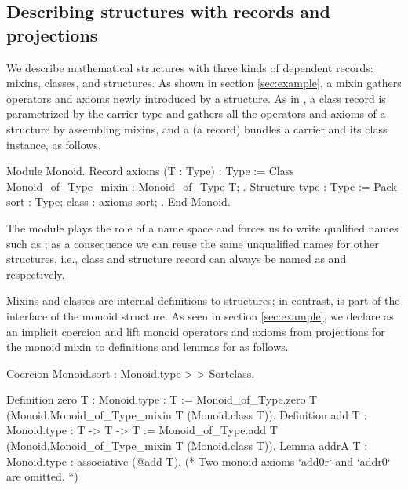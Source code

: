 \documentclass[a4paper,UKenglish,cleveref, autoref]{lipics-v2019}
\newcommand{\mixin}{mixin}
\theoremstyle{implem}
\theoremstyle{implem}
\theoremstyle{command}
\begin{document}
\subsection{Describing structures with records and projections}

We describe mathematical structures with three kinds of dependent records: mixins, classes, and structures.
As shown in section \ref{sec:example}, a \mixin{} gathers operators and axioms newly introduced by a structure.
As in \cite[section 2.4]{DBLP:conf/tphol/GarillotGMR09}\cite[section 2]{KSdraft}, a class record is parametrized by the carrier type  and gathers all the operators and axioms of a structure by assembling mixins, and a  (a record) bundles a carrier and its class instance, as follows.
\begin{coqcode}
Module Monoid.
Record axioms (T : Type) : Type :=
  Class { Monoid_of_Type_mixin : Monoid_of_Type T; }.
Structure type : Type := Pack { sort : Type; class : axioms sort; }.
End Monoid.
\end{coqcode}
The  module plays the role of a name space and forces us to write
qualified names such as ; as a consequence we can reuse the
same unqualified names for other structures, i.e., class and structure record
can always be named as  and  respectively.

Mixins and classes are internal definitions to structures; in contrast,
 is part of the interface of the monoid structure.
As seen in section \ref{sec:example}, we declare  as an
implicit coercion and lift monoid operators and axioms from projections for
the monoid \mixin{} to definitions and lemmas for  as follows.
\begin{coqcode}
Coercion Monoid.sort : Monoid.type >-> Sortclass.

Definition zero {T : Monoid.type} : T :=
  Monoid_of_Type.zero T (Monoid.Monoid_of_Type_mixin T (Monoid.class T)).
Definition add {T : Monoid.type} : T -> T -> T :=
  Monoid_of_Type.add T (Monoid.Monoid_of_Type_mixin T (Monoid.class T)).
Lemma addrA {T : Monoid.type} : associative (@add T).
(* Two monoid axioms `add0r` and `addr0` are omitted. *)
\end{coqcode}
\end{document}
